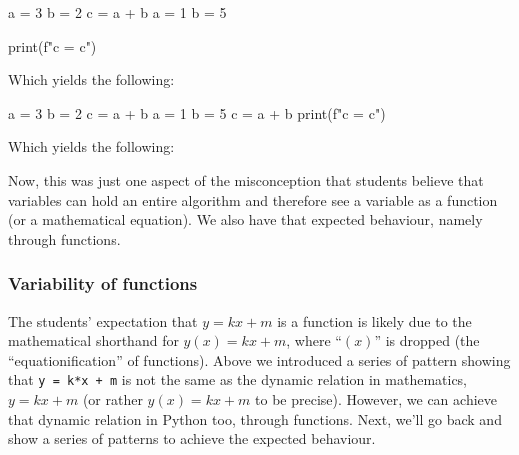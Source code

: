 \begin{description}
      \begin{minipage}[t]{0.45\columnwidth}
        \begin{pyblock}[varstateG1]
a = 3
b = 2
c = a + b
a = 1
b = 5

print(f"c = {c}")
        \end{pyblock}

        \vspace{0.5em}
        Which yields the following:
        \printpythontex[verbatim]
      \end{minipage}
      \hfill
      \begin{minipage}[t]{0.45\columnwidth}
        \begin{pyblock}[varstateG1][highlightlines=6]
a = 3
b = 2
c = a + b
a = 1
b = 5
c = a + b
print(f"c = {c}")
        \end{pyblock}

        \vspace{0.5em}
        Which yields the following:
        \printpythontex[verbatim]
      \end{minipage}
\end{description}

Now, this was just one aspect of the misconception that students believe that 
variables can hold an entire algorithm and therefore see a variable as a 
function (or a mathematical equation).
We also have that expected behaviour, namely through functions.

\subsubsection{Variability of functions}

The students' expectation that \(y = kx + m\) is a function 
\parencite{Kohn2017VariableEvaluation,Plass2015Variables,Doukakis2007} is 
likely due to the mathematical shorthand for \(y(x) = kx + m\), where 
\enquote{\((x)\)} is dropped (the \enquote{equationification} of functions).
Above we introduced a series of pattern showing that
\texttt{y = k*x + m}
is not the same as the dynamic relation in mathematics,
\(y = kx + m\) (or rather \(y(x) = kx + m\) to be precise).
However, we can achieve that dynamic relation in Python too, through functions.
Next, we'll go back and show a series of patterns to achieve the expected 
behaviour.

